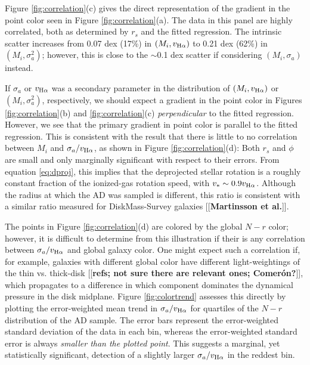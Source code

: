 \documentclass[apj,iop,revtex4,numberedappendix]{emulateapj}
\newcommand{\comment}[2][todo]{{\color{#1}[[{\bf #2}]]}}
\begin{document}
Figure \ref{fig:correlation}(c) gives the direct representation of the
gradient in the point color seen in Figure \ref{fig:correlation}(a).
The data in this panel are highly correlated, both as determined by
$r_s$ and the fitted regression.  The intrinsic scatter increases from
0.07 dex (17\%) in $(M_i,v_{{\rm H}\alpha})$ to 0.21 dex (62\%) in
$(M_i,\sigma_a^2)$; however, this is close to the $\sim$0.1 dex scatter
if considering $(M_i,\sigma_a)$ instead.

If $\sigma_a$ or $v_{{\rm H}\alpha}$ was a secondary parameter in the
distribution of $(M_i,v_{{\rm H}\alpha})$ or $(M_i,\sigma_a^2)$,
respectively, we should expect a gradient in the point color in Figures
\ref{fig:correlation}(b) and \ref{fig:correlation}(c) {\em
perpendicular} to the fitted regression.  However, we see that the
primary gradient in point color is parallel to the fitted regression.
This is consistent with the result that there is little to no
correlation between $M_i$ and $\sigma_a/v_{{\rm H}\alpha}$, as shown in
Figure \ref{fig:correlation}(d):  Both $r_s$ and $\phi$ are small and
only marginally significant with respect to their errors.  From equation
\ref{eq:dproj}, this implies that the deprojected stellar rotation is a
roughly constant fraction of the ionized-gas rotation speed, with
$v_{\ast} \sim 0.9 v_{{\rm H}\alpha}$.  Although the radius at which the
AD was sampled is different, this ratio is consistent with a similar
ratio measured for DiskMass-Survey galaxies \comment{Martinsson et al.}.

The points in Figure \ref{fig:correlation}(d) are colored by the global
$N-r$ color; however, it is difficult to determine from this
illustration if their is any correlation between $\sigma_a/v_{{\rm
H}\alpha}$ and global galaxy color.  One might expect such a correlation
if, for example, galaxies with different global color have different
light-weightings of the thin vs. thick-disk \comment{refs; not sure
there are relevant ones; Comer\'{o}n?}, which propagates to a difference
in which component dominates the dynamical pressure in the disk
midplane.  Figure \ref{fig:colortrend} assesses this directly by
plotting the error-weighted mean trend in $\sigma_a/v_{{\rm H}\alpha}$
for quartiles of the $N-r$ distribution of the AD sample.  The error
bars represent the error-weighted standard deviation of the data in each
bin, whereas the error-weighted standard error is always {\it smaller
than the plotted point}.  This suggests a marginal, yet statistically
significant, detection of a slightly larger $\sigma_a/v_{{\rm H}\alpha}$
in the reddest bin.
\end{document}
